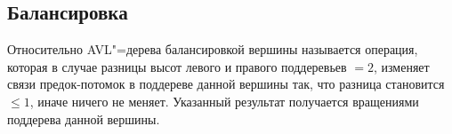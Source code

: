 \begin{frame}
    \section{Балансировка}

    Относительно AVL"=дерева балансировкой вершины называется операция,
    которая в случае разницы высот левого и правого поддеревьев $= 2$,
    изменяет связи предок-потомок в поддереве данной вершины так,
    что разница становится $ \leqslant 1$, иначе ничего не меняет.
    Указанный результат получается вращениями поддерева данной вершины.
    
\end{frame}